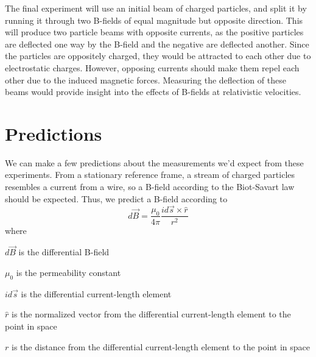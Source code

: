 \documentclass[12pt,letterpaper]{article}
\begin{document}
The final experiment will use an initial beam of charged particles, and split it by running it through two B-fields of equal magnitude but opposite direction.
This will produce two particle beams with opposite currents, as the positive particles are deflected one way by the B-field and the negative are deflected another.
Since the particles are oppositely charged, they would be attracted to each other due to electrostatic charges.
However, opposing currents should make them repel each other due to the induced magnetic forces. Measuring the deflection of these beams would provide insight into the effects of B-fields at relativistic velocities.

\section{Predictions}

We can make a few predictions about the measurements we'd expect from these experiments. From a stationary reference frame, a stream of charged particles resembles a current from a wire, so a B-field according to the Biot-Savart law should be expected. Thus, we predict a B-field according to
\[
	d\vec{B} = \frac{\mu_0}{4\pi}\frac{id\vec{s} \times \hat{r}}{r^2}
\]
where
\begin{description}
	\item $d\vec{B}$ is the differential B-field
	\item $\mu_0$ is the permeability constant
	\item $id\vec{s}$ is the differential current-length element
	\item $\hat{r}$ is the normalized vector from the differential current-length element to the point in space
	\item $r$ is the distance from the differential current-length element to the point in space
\end{description}
\end{document}
